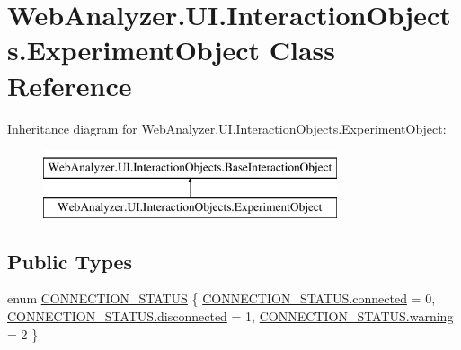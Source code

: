 \hypertarget{class_web_analyzer_1_1_u_i_1_1_interaction_objects_1_1_experiment_object}{}\section{Web\+Analyzer.\+U\+I.\+Interaction\+Objects.\+Experiment\+Object Class Reference}
\label{class_web_analyzer_1_1_u_i_1_1_interaction_objects_1_1_experiment_object}
Inheritance diagram for Web\+Analyzer.\+U\+I.\+Interaction\+Objects.\+Experiment\+Object\+:\begin{figure}[H]
\begin{center}
\leavevmode
\includegraphics[height=2.000000cm]{class_web_analyzer_1_1_u_i_1_1_interaction_objects_1_1_experiment_object}
\end{center}
\end{figure}
\subsection*{Public Types}
\begin{DoxyCompactItemize}
\item 
enum \hyperlink{class_web_analyzer_1_1_u_i_1_1_interaction_objects_1_1_experiment_object_a2875208b4f4b0ed643593152f4ec025c}{C\+O\+N\+N\+E\+C\+T\+I\+O\+N\+\_\+\+S\+T\+A\+T\+U\+S} \{ \hyperlink{class_web_analyzer_1_1_u_i_1_1_interaction_objects_1_1_experiment_object_a2875208b4f4b0ed643593152f4ec025ca06aa6fa8bdc2078e7e1bd903e70c8f6a}{C\+O\+N\+N\+E\+C\+T\+I\+O\+N\+\_\+\+S\+T\+A\+T\+U\+S.\+connected} = 0, 
\hyperlink{class_web_analyzer_1_1_u_i_1_1_interaction_objects_1_1_experiment_object_a2875208b4f4b0ed643593152f4ec025ca3a561116f0c9675a3c83d21fa365050d}{C\+O\+N\+N\+E\+C\+T\+I\+O\+N\+\_\+\+S\+T\+A\+T\+U\+S.\+disconnected} = 1, 
\hyperlink{class_web_analyzer_1_1_u_i_1_1_interaction_objects_1_1_experiment_object_a2875208b4f4b0ed643593152f4ec025ca7b83d3f08fa392b79e3f553b585971cd}{C\+O\+N\+N\+E\+C\+T\+I\+O\+N\+\_\+\+S\+T\+A\+T\+U\+S.\+warning} = 2
 \}
\end{DoxyCompactItemize}
